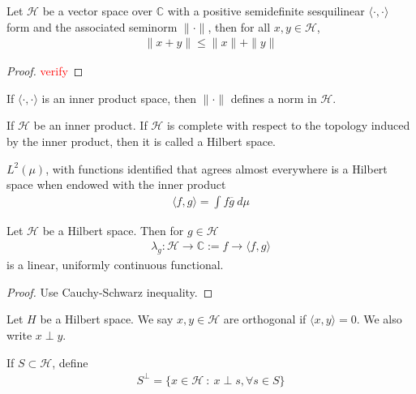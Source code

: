 

\begin{theorem}
  Let $\mathcal{H}$ be a vector space over $\mathbb{C}$ with a
  positive semidefinite sesquilinear $ \langle \cdot , \cdot \rangle
  $ form and the associated seminorm $ \|\cdot\|$, then for all $x, y
  \in \mathcal{H}$,
  \begin{align*}
    \|x+y\| \le \|x\| + \|y\|
  \end{align*}
\end{theorem}
\begin{proof}
  \textcolor{red}{verify}
\end{proof}

\begin{remark}
  If $\langle \cdot , \cdot \rangle $ is an inner product space, then
  $\|\cdot\|$ defines a norm in $ \mathcal{H}$.
\end{remark}

\begin{definition}
  If $ \mathcal{H}$ be an inner product. If $\mathcal{H}$ is complete
  with respect to the topology induced by the inner product, then it
  is called a Hilbert space.
\end{definition}

\begin{example}
  $L^2(\mu)$, with functions identified that agrees almost everywhere
  is a Hilbert space when endowed with the inner product
  \begin{align*}
    \langle f , g \rangle  = \int f \overline{g} \ d \mu
  \end{align*}
\end{example}

\begin{proposition}
  Let $\mathcal{H}$ be a Hilbert space. Then for $g \in \mathcal{H}$
  \begin{align*}
    \lambda_g : \mathcal{H} \to \mathbb{C} := f \to \langle f , g \rangle
  \end{align*}
  is a linear, uniformly continuous functional.
\end{proposition}
\begin{proof}
  Use Cauchy-Schwarz inequality.
\end{proof}

\begin{definition}
  Let $H$ be a Hilbert space. We say $x, y \in \mathcal{H}$ are
  orthogonal if $\langle  x , y \rangle  = 0$. We also write $x \perp y$.

  If $ S \subset \mathcal{H}$, define
  \begin{align*}
    S^\perp = \{ x \in \mathcal{H}  \ : \   x \perp s, \forall s \in S \}
  \end{align*}
\end{definition}


